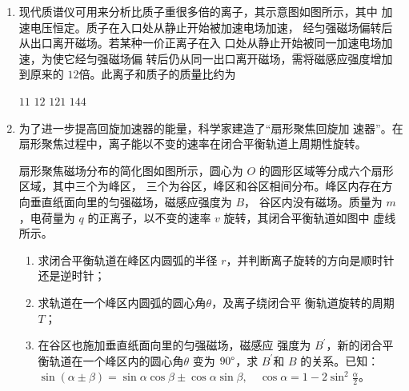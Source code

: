 \begin{enumerate}
\item 
{}
现代质谱仪可用来分析比质子重很多倍的离子，其示意图如图所示，其中
加速电压恒定。质子在入口处从静止开始被加速电场加速，
经匀强磁场偏转后从出口离开磁场。若某种一价正离子在入
口处从静止开始被同一加速电场加速，为使它经匀强磁场偏
转后仍从同一出口离开磁场，需将磁感应强度增加到原来的
$ 12 $倍。此离子和质子的质量比约为  
\begin{figure}[h!]
	\centering
	
\end{figure}

\fourchoices
{$ 11 $}
{$ 12 $}
{$ 121 $}
{$ 144 $}



\item 
{}
为了进一步提高回旋加速器的能量，科学家建造了“扇形聚焦回旋加
速器”。在扇形聚焦过程中，离子能以不变的速率在闭合平衡轨道上周期性旋转。

扇形聚焦磁场分布的简化图如图所示，圆心为 $ O $ 的圆形区域等分成六个扇形区域，其中三个为峰区，
三个为谷区，峰区和谷区相间分布。峰区内存在方向垂直纸面向里的匀强磁场，磁感应强度为 $ B $，
谷区内没有磁场。质量为 $ m $，电荷量为 $ q $ 的正离子，以不变的速率 $ v $ 旋转，其闭合平衡轨道如图中
虚线所示。
\begin{enumerate}
	\item
求闭合平衡轨道在峰区内圆弧的半径 $ r $，并判断离子旋转的方向是顺时针还是逆时针；

\item 
求轨道在一个峰区内圆弧的圆心角$ \theta $，及离子绕闭合平
衡轨道旋转的周期 $ T $；

\item 
在谷区也施加垂直纸面向里的匀强磁场，磁感应
强度为 $ B ^{\prime} $，新的闭合平衡轨道在一个峰区内的圆心角$ \theta $
变为 $ 90 \degree $，求 $ B ^{\prime} $和 $ B $ 的关系。已知：$\sin (\alpha \pm \beta)=\sin \alpha \cos \beta \pm \cos \alpha \sin \beta, \quad \cos \alpha=1-2 \sin ^{2} \frac{\alpha}{2}$。
	
\end{enumerate}
\begin{figure}[h!]
	\flushright
	
\end{figure}



\end{enumerate}

